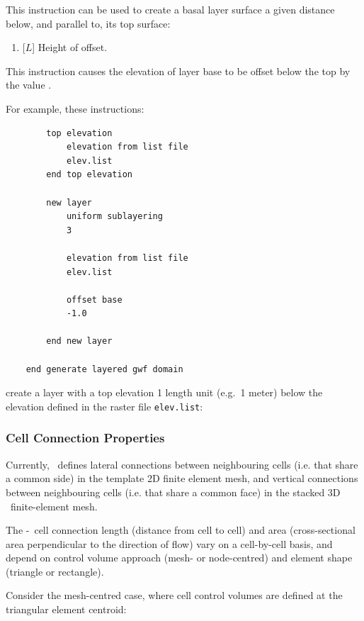 {This instruction can be used to create a basal layer surface a given distance below, and parallel to, its top surface:

    {\squish
    \begin{enumerate}
        \item {} [$L$] Height of offset.
    \end{enumerate}
    This instruction causes the elevation of layer base to be offset below the  top by the  value .
}

\pagebreak
For example, these instructions:
\begin{verbatim}
        top elevation
            elevation from list file
            elev.list
        end top elevation

        new layer
            uniform sublayering
            3

            elevation from list file
            elev.list

            offset base
            -1.0

        end new layer

    end generate layered gwf domain
\end{verbatim}
 create a layer with a top elevation 1 length unit (e.g.\ 1 meter) below the elevation defined in the raster file \texttt{elev.list}:


\subsubsection{Cell Connection Properties}
\label{section:GWFCellConnections}

Currently, \mut\ defines lateral connections between neighbouring cells (i.e. that share a common side) in the template 2D finite element mesh, and vertical connections between neighbouring cells (i.e. that share a common face) in the stacked 3D \gwf\ finite-element mesh.

The \gwf-\gwf\ cell connection length (distance from cell to cell) and area (cross-sectional area perpendicular to the direction of flow) vary on a cell-by-cell basis, and depend on control volume approach (mesh- or node-centred) and element shape (triangle or rectangle).

Consider the mesh-centred case, where cell control volumes are defined at the triangular element centroid:

}
